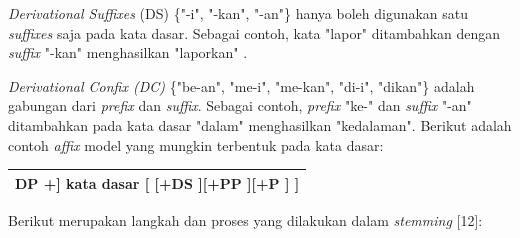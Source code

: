 \textit{Derivational Suffixes} (DS)\textit{ }\{"-i", "-kan", 
"-an"\} hanya boleh digunakan satu \textit{suffixes} saja pada kata 
dasar. Sebagai contoh, kata "lapor" ditambahkan dengan \textit{suffix
} "-kan" menghasilkan "laporkan" \cite{12}.

\textit{Derivational Confix (DC) }\{"be-an", "me-i", "me-kan", 
"di-i", "dikan"\} adalah gabungan dari \textit{prefix }dan
\textit{ suffix}. Sebagai contoh, \textit{prefix }"ke-" dan 
\textit{suffix }"-an" ditambahkan pada kata dasar "dalam" 
menghasilkan "kedalaman". Berikut adalah contoh \textit{affix }model 
yang mungkin terbentuk pada kata dasar:

\begin{table}[H]
	\small
	\begin{adjustbox}{width=1\textwidth}
	\begin{tabular}{|>{\centering\arraybackslash}p{13.55cm}|}
		\hline
		[ [ DP +][ DP +] DP +] kata dasar [ [+DS ][+PP ][+P ] ]\\
		\hline
	\end{tabular}
	\end{adjustbox}
\end{table}
\vspace{-0.5cm}
\noindent Berikut merupakan langkah dan proses yang dilakukan dalam \textit{stemming} [12]:

